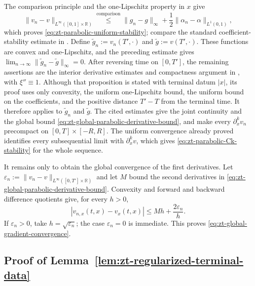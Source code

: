\documentclass[10pt]{amsart}
\theoremstyle{definition}
\theoremstyle{remark}
\numberwithin{equation}{section}
\newcommand{\R}{\mathbb R}
\newcommand{\1}{\mathbf 1}
\newcommand{\stackref}[2]{\stackrel{#2}{#1}}
\begin{document}
The comparison principle and the one-Lipschitz property in $x$ give
\begin{equation*}
 \|v_n-v\|_{L^\infty([0,1]\times\R)}
 \stackref{\leq}{\text{comparison}}
 \|g_n-g\|_\infty
 +\frac12\|\alpha_n-\alpha\|_{L^1(0,1)},
\end{equation*}
which proves \eqref{eq:zt-parabolic-uniform-stability}; compare the standard coefficient-stability estimate in \cite[Proposition~2(i), equation~(7)]{ChenHandschyLerman}. Define $\widetilde g_n:=v_n(T',\cdot)$ and $\widetilde g:=v(T',\cdot)$. These functions are convex and one-Lipschitz, and the preceding estimate gives $\lim_{n\to\infty}\|\widetilde g_n-\widetilde g\|_\infty=0$. After reversing time on $[0,T']$, the remaining assertions are the interior derivative estimates and compactness argument in \cite[Proposition~2(ii) and the proof of Proposition~2(iii)]{ChenHandschyLerman}, with $\xi''\equiv1$. Although that proposition is stated with terminal datum $|x|$, its proof uses only convexity, the uniform one-Lipschitz bound, the uniform bound on the coefficients, and the positive distance $T'-T$ from the terminal time. It therefore applies to $\widetilde g_n$ and $\widetilde g$. The cited estimates give the joint continuity and the global bound \eqref{eq:zt-global-parabolic-derivative-bound}, and make every $\partial_x^kv_n$ precompact on $[0,T]\times[-R,R]$. The uniform convergence already proved identifies every subsequential limit with $\partial_x^kv$, which gives \eqref{eq:zt-parabolic-Ck-stability} for the whole sequence.

It remains only to obtain the global convergence of the first derivatives. Let $\varepsilon_n:=\|v_n-v\|_{L^\infty([0,T']\times\R)}$ and let $M$ bound the second derivatives in \eqref{eq:zt-global-parabolic-derivative-bound}. Convexity and forward and backward difference quotients give, for every $h>0$,
\begin{equation*}
 |v_{n,x}(t,x)-v_x(t,x)|
 \leq Mh+\frac{2\varepsilon_n}{h}.
\end{equation*}
If $\varepsilon_n>0$, take $h=\sqrt{\varepsilon_n}$; the case $\varepsilon_n=0$ is immediate. This proves \eqref{eq:zt-global-gradient-convergence}.

\subsection{Proof of Lemma~\ref{lem:zt-regularized-terminal-data}}\label{a.pf.lem:zt-regularized-terminal-data}
\end{document}
